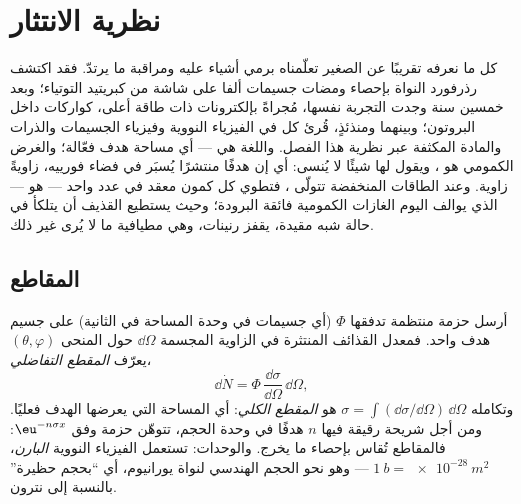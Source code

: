 \chapter{نظرية الانتثار}\label{ch:b3:scattering-theory}

كل ما نعرفه تقريبًا عن الصغير تعلّمناه برمي أشياء
عليه ومراقبة ما يرتدّ. فقد اكتشف رذرفورد النواة بإحصاء
ومضات جسيمات ألفا على شاشة من كبريتيد التوتياء؛ وبعد
خمسين سنة وجدت التجربة نفسها، مُجراةً بإلكترونات ذات طاقة أعلى،
كواركات داخل البروتون؛ وبينهما ومنذئذٍ، قُرئ كل 
في الفيزياء النووية وفيزياء الجسيمات والذرات والمادة المكثفة
عبر نظرية هذا الفصل. واللغة هي
\emph{} --- أي مساحة هدف فعّالة؛
والغرض الكمومي هو \emph{}، ويقول  لها شيئًا لا يُنسى: أي إن هدفًا منتشرًا يُسبَر
في فضاء فورييه، زاويةً زاوية. وعند الطاقات المنخفضة تتولّى ، فتطوي كل كمون معقد في عدد
واحد --- هو  --- الذي يوالف اليوم الغازات الكمومية
فائقة البرودة؛ وحيث يستطيع القذيف أن يتلكأ في حالة شبه مقيدة،
يقفز  رنينات، وهي مطيافية ما لا يُرى غير ذلك.

\section{المقاطع}

\begin{definition}[المقطع]\label{def:b3:scattering-theory:cross-section}
أرسل حزمة منتظمة تدفقها $\Phi$ (أي جسيمات في وحدة المساحة في
الثانية) على جسيم هدف واحد. فمعدل القذائف المنتثرة
في الزاوية المجسمة $\dd\Omega$ حول المنحى $(\theta,
\varphi)$ يعرّف \emph{المقطع التفاضلي}،
\[
\dd\dot N = \Phi\,\frac{\dd\sigma}{\dd\Omega}\,\dd\Omega ,
\]
وتكامله $\sigma = \int(\dd\sigma/\dd\Omega)\,\dd\Omega$ هو
\emph{المقطع الكلي}: أي المساحة التي يعرضها الهدف فعليًا.
ومن أجل شريحة رقيقة فيها $n$ هدفًا في وحدة الحجم، تتوهّن حزمة
وفق $\eu^{-n\sigma x}$: فالمقاطع تُقاس
بإحصاء ما يخرج. والوحدات: تستعمل الفيزياء النووية \emph{البارن}،
$\qty{1}{b} = \qty{e-28}{m^2}$ --- وهو نحو الحجم الهندسي لنواة
يورانيوم، أي ``بحجم حظيرة'' بالنسبة إلى نترون.
\end{definition}

